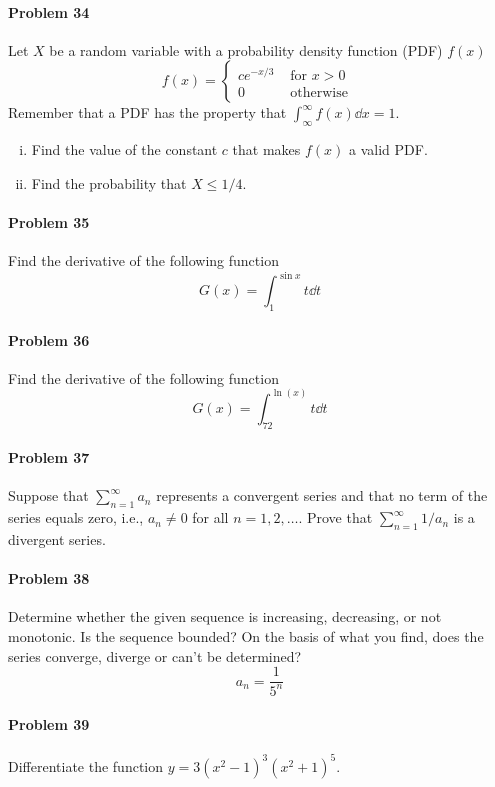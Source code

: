 \documentclass[a4paper, 11pt]{article}
\begin{document}
\paragraph{Problem 34}
Let $X$ be a random variable with a probability density function (PDF) $f(x)$
\[
	f(x) = \begin{cases}
 				ce^{-x/3} & \text{ for } x > 0 \\
 				0 & \text{ otherwise }
 		   \end{cases}
\]
Remember that a PDF has the property that $\int_{\infty}^{\infty} f(x)\dd x = 1$.
\begin{enumerate}[(i)]
	\item Find the value of the constant $c$ that makes $f(x)$ a valid PDF.
	\item Find the probability that $X \leq 1/4$.
\end{enumerate}


\paragraph{Problem 35}
Find the derivative of the following function
\[
	G(x) = \int_{1}^{\sin{x}} t \dd t
\]


\paragraph{Problem 36}
Find the derivative of the following function
\[
	G(x) = \int_{72}^{\ln(x)} t \dd t
\]


\paragraph{Problem 37}
Suppose that $\sum_{n=1}^{\infty} a_n$ represents a convergent series and that no term of the series equals zero, i.e., $a_n \neq 0$ for all $n=1,2, \dots$.
Prove that $\sum_{n=1}^{\infty} 1/a_n$ is a divergent series.


\paragraph{Problem 38}
Determine whether the given sequence is increasing, decreasing, or not monotonic.
Is the sequence bounded?  On the basis of what you find, does the series converge, diverge or can't be determined?
\[
	a_n = \frac{1}{5^n}
\]


\paragraph{Problem 39}
Differentiate the function $y = 3(x^2-1)^3 (x^2 + 1)^5$.
\end{document}
